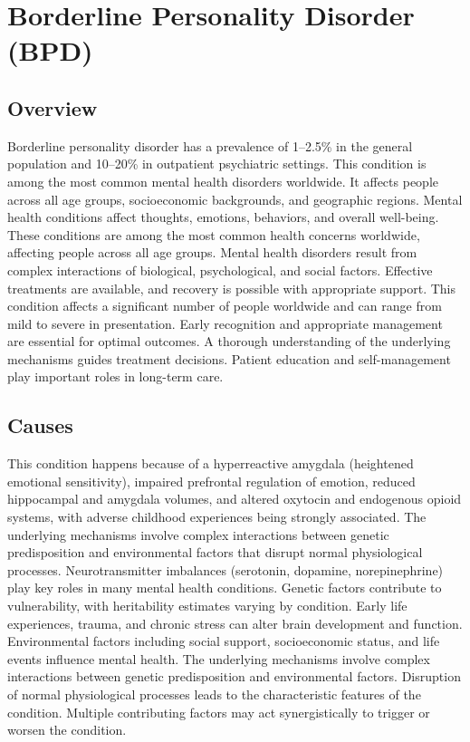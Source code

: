 \chapter{Borderline Personality Disorder (BPD)}
\label{sec:Borderline Personality Disorder (BPD)}

\section{Overview}
Borderline personality disorder has a prevalence of 1--2.5\% in the general population and 10--20\% in outpatient psychiatric settings. This condition is among the most common mental health disorders worldwide. It affects people across all age groups, socioeconomic backgrounds, and geographic regions. Mental health conditions affect thoughts, emotions, behaviors, and overall well-being. These conditions are among the most common health concerns worldwide, affecting people across all age groups. Mental health disorders result from complex interactions of biological, psychological, and social factors. Effective treatments are available, and recovery is possible with appropriate support. This condition affects a significant number of people worldwide and can range from mild to severe in presentation. Early recognition and appropriate management are essential for optimal outcomes. A thorough understanding of the underlying mechanisms guides treatment decisions. Patient education and self-management play important roles in long-term care.
\section{Causes}
This condition happens because of a hyperreactive amygdala (heightened emotional sensitivity), impaired prefrontal regulation of emotion, reduced hippocampal and amygdala volumes, and altered oxytocin and endogenous opioid systems, with adverse childhood experiences being strongly associated. The underlying mechanisms involve complex interactions between genetic predisposition and environmental factors that disrupt normal physiological processes. Neurotransmitter imbalances (serotonin, dopamine, norepinephrine) play key roles in many mental health conditions. Genetic factors contribute to vulnerability, with heritability estimates varying by condition. Early life experiences, trauma, and chronic stress can alter brain development and function. Environmental factors including social support, socioeconomic status, and life events influence mental health. The underlying mechanisms involve complex interactions between genetic predisposition and environmental factors. Disruption of normal physiological processes leads to the characteristic features of the condition. Multiple contributing factors may act synergistically to trigger or worsen the condition.
